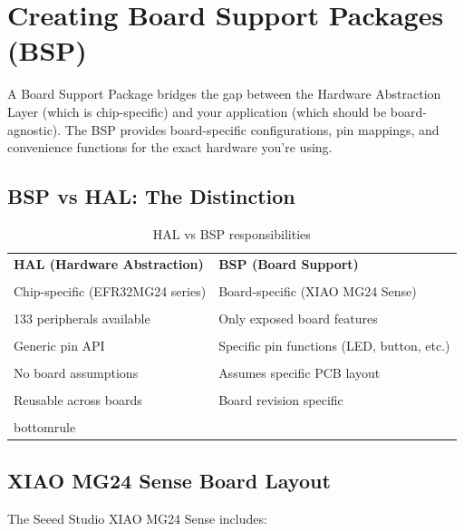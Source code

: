
\section{Creating Board Support Packages (BSP)}
\label{sec:bsp-implementation}

A Board Support Package bridges the gap between the Hardware Abstraction Layer (which is chip-specific) and your application (which should be board-agnostic). The BSP provides board-specific configurations, pin mappings, and convenience functions for the exact hardware you're using.

\subsection{BSP vs HAL: The Distinction}
\label{subsec:bsp-vs-hal}

\begin{table}[H]
    \centering
    \begin{tabular}{l l}
        \toprule
        \textbf{HAL (Hardware Abstraction)} & \textbf{BSP (Board Support)} \\\\\midrule
        Chip-specific (EFR32MG24 series) & Board-specific (XIAO MG24 Sense) \\\\
        133 peripherals available & Only exposed board features \\\\
        Generic pin API & Specific pin functions (LED, button, etc.) \\\\
        No board assumptions & Assumes specific PCB layout \\\\
        Reusable across boards & Board revision specific \\\\
bottomrule
    \end{tabular}
    \caption{HAL vs BSP responsibilities}
    \label{tab:hal-vs-bsp}
\end{table}

\subsection{XIAO MG24 Sense Board Layout}
\label{subsec:xiao-layout}

The Seeed Studio XIAO MG24 Sense includes:

